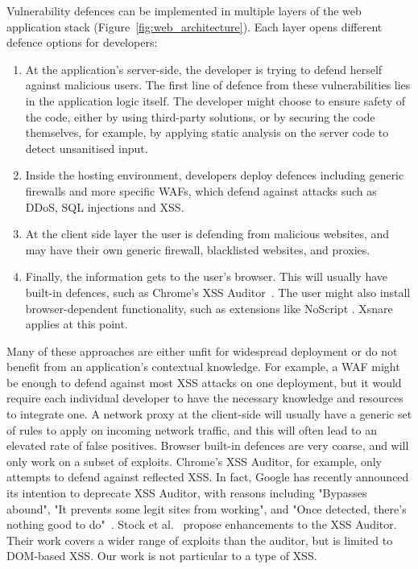 Vulnerability defences can be implemented in multiple layers of the web application stack (Figure~\ref{fig:web_architecture}). Each layer opens different defence options for developers:
\begin{enumerate}
	\item At the application's server-side, the developer is
          trying to defend herself against malicious users. The first
          line of defence from these vulnerabilities lies in the
          application logic itself. The developer might choose to
          ensure safety of the code, either by using third-party
          solutions, or by securing the code themselves, for example,
          by applying static analysis on the server code to detect
          unsanitised input.
	\item Inside the hosting environment, developers deploy
          defences including generic firewalls and more specific \acp{WAF}, which defend against attacks
          such as \ac{DDoS}, SQL injections and \ac{XSS}.
	\item At the client side layer the user is defending from
          malicious websites, and may have their own generic firewall,
          blacklisted websites, and proxies.
	\item Finally, the information gets to the user's
          browser. This will usually have built-in defences, such as
          Chrome's \ac{XSS} Auditor~\cite{xssauditor}. The user might also
          install browser-dependent functionality, such as extensions
          like NoScript \cite{Noscript}. Xsnare applies at this point.
\end{enumerate}

Many of these approaches are either unfit for widespread deployment or
do not benefit from an application's contextual knowledge. For
example, a \ac{WAF} might be enough to defend against most \ac{XSS} attacks on
one deployment, but it would require each individual developer to have
the necessary knowledge and resources to integrate one. A network
proxy at the client-side will usually have a generic set of rules to
apply on incoming network traffic, and this will often lead to an
elevated rate of false positives. Browser built-in defences are very
coarse, and will only work on a subset of exploits. Chrome's XSS
Auditor, for example, only attempts to defend against reflected
\ac{XSS}. In fact, Google has recently announced its intention to deprecate
XSS Auditor, with reasons including "Bypasses abound", "It prevents
some legit sites from working", and "Once detected, there’s nothing
good to do"~\cite{deprecatexssauditor}. Stock et
al.~\cite{Stock:2017:WTI:3241189.3241265} propose enhancements to the
XSS Auditor. Their work covers a wider range of exploits than the
auditor, but is limited to DOM-based \ac{XSS}. Our work is not particular
to a type of \ac{XSS}.

